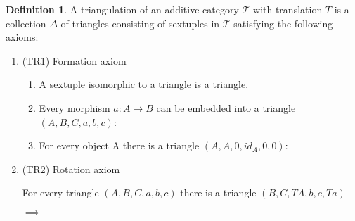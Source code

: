 \documentclass[12pt]{article}
\theoremstyle{definition}
\newtheorem{definition}{Definition}[section]
\theoremstyle{remark}
\begin{document}
        \begin{definition}
            A triangulation of an additive category $\mathcal{T}$ with translation $T$ is a collection $\Delta$ of triangles consisting of sextuples in $\mathcal{T}$ satisfying the following axioms: 

            \begin{enumerate}
                \item (TR1) Formation axiom

                    \begin{enumerate}
                        \item A sextuple isomorphic to a triangle is a triangle.
                        \item Every morphism $a : A \rightarrow B$ can be embedded into a triangle $(A,B,C,a,b,c)$:
                        \begin{center}
                        \end{center}
                        \item For every object A there is a triangle $(A,A,0,id_A,0,0)$:
                        \begin{center}
                        \end{center}
                    \end{enumerate}
                \item (TR2) Rotation axiom

                    For every triangle $(A,B,C,a,b,c)$ there is a triangle $(B,C,TA,b,c,Ta)$
                    \begin{center}
                         $\implies$
                        

\end{center}
\end{enumerate}
\end{definition}
\end{document}
